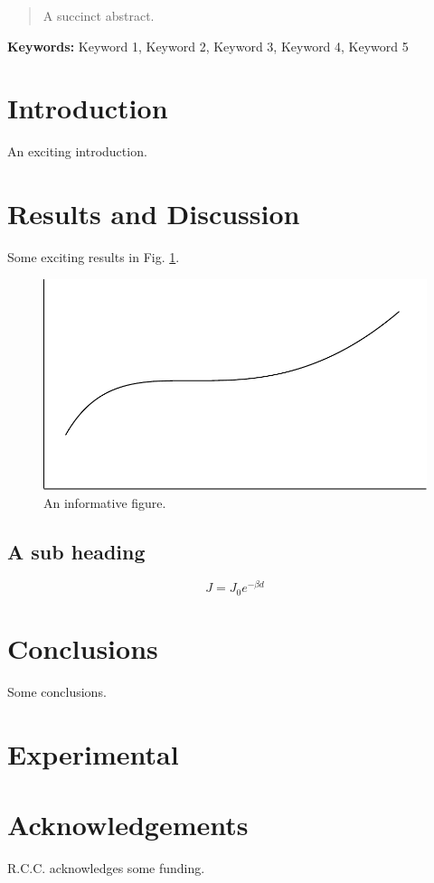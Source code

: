 \documentclass{rcclab}
\begin{document}
\maketitle

\begin{abstract}

A succinct abstract.

\end{abstract}

\textbf{Keywords:} Keyword 1, Keyword 2, Keyword 3, Keyword 4, Keyword 5

%
%

\section{Introduction}

An exciting introduction.\autocite{Chiechi2008}





\section{Results and Discussion}

Some exciting results in Fig. \ref{fig:usefulplot}.


\begin{figure}
    \centering
    \includegraphics[width=0.7\linewidth]{Figure1}
    \caption{An informative figure.}
    \label{fig:usefulplot}
\end{figure}

\subsection{A sub heading}


\begin{equation}
    \label{eq:beta}
    J = J_0 e^{-\beta d}
\end{equation}



\section{Conclusions}

Some conclusions.

\section{Experimental}


\section{Acknowledgements}

R.C.C. acknowledges some funding.

\clearpage
\printbibliography
\end{document}
